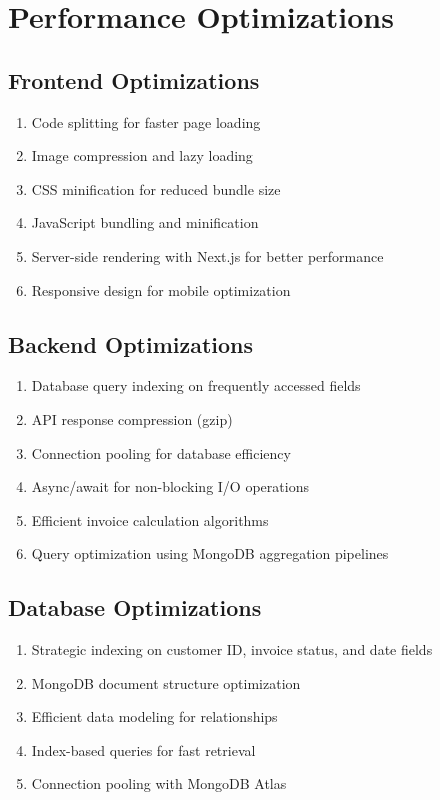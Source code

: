 \documentclass[12pt,a4paper]{report}
\begin{document}
\section{Performance Optimizations}

\subsection{Frontend Optimizations}

\begin{enumerate}[label=\roman*)]
    \item Code splitting for faster page loading
    \item Image compression and lazy loading
    \item CSS minification for reduced bundle size
    \item JavaScript bundling and minification
    \item Server-side rendering with Next.js for better performance
    \item Responsive design for mobile optimization
\end{enumerate}

\subsection{Backend Optimizations}

\begin{enumerate}[label=\roman*)]
    \item Database query indexing on frequently accessed fields
    \item API response compression (gzip)
    \item Connection pooling for database efficiency
    \item Async/await for non-blocking I/O operations
    \item Efficient invoice calculation algorithms
    \item Query optimization using MongoDB aggregation pipelines
\end{enumerate}

\subsection{Database Optimizations}

\begin{enumerate}[label=\roman*)]
    \item Strategic indexing on customer ID, invoice status, and date fields
    \item MongoDB document structure optimization
    \item Efficient data modeling for relationships
    \item Index-based queries for fast retrieval
    \item Connection pooling with MongoDB Atlas
\end{enumerate}
\end{document}
